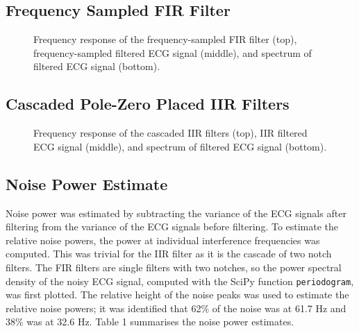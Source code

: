 \documentclass[12pt]{article}
\begin{document}
\subsection{Frequency Sampled FIR Filter}
\begin{figure}[H]
    \centering
    \caption{Frequency response of the frequency-sampled FIR filter (top), frequency-sampled filtered ECG signal (middle), and spectrum of filtered ECG signal (bottom).}
    \label{fig:fir-freq}
\end{figure}

\subsection{Cascaded Pole-Zero Placed IIR Filters}
\begin{figure}[H]
    \centering
    \caption{Frequency response of the cascaded IIR filters (top), IIR filtered ECG signal (middle), and spectrum of filtered ECG signal (bottom).}
    \label{fig:iir-resp}
\end{figure}

\subsection{Noise Power Estimate}
Noise power was estimated by subtracting the variance of the ECG signals after filtering from the variance of the
ECG signals before filtering. To estimate the relative noise powers, the power at individual interference frequencies
was computed. This was trivial for the IIR filter as it is the cascade of two notch filters. The FIR filters are single
filters with two notches, so the power spectral density of the noisy ECG signal, computed with the SciPy function
\texttt{periodogram}, was first plotted. The relative height of the noise peaks was used to estimate the relative
noise powers; it was identified that 62\% of the noise was at 61.7 Hz and 38\% was at 32.6 Hz. Table 1 summarises 
the noise power estimates.
\begin{table}[H]
    \caption{Noise power estimates obtained after each filter.}
    \label{table:noise-power}
\end{table}
\end{document}
